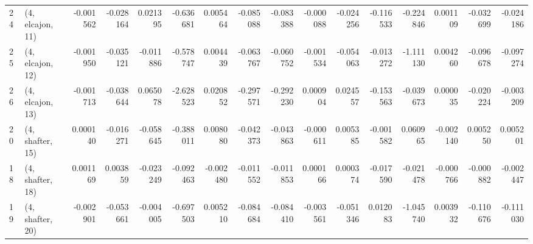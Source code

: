 \begin{tabular}{llrrrrrrrrrrrrrr}
24 &  (4, elcajon, 11) &  -0.001562 & -0.028164 &  0.021395 &  -0.636681 &  0.005464 &  -0.085088 & -0.083388 & -0.000088 & -0.024256 & -0.116533 &  -0.224846 &  0.001109 & -0.032699 & -0.024186 \\
25 &  (4, elcajon, 12) &  -0.001950 & -0.035121 & -0.011886 &  -0.578747 &  0.004439 &  -0.063767 & -0.060752 & -0.001534 & -0.054063 & -0.013272 &  -1.111130 &  0.004260 & -0.096678 & -0.097274 \\
26 &  (4, elcajon, 13) &  -0.001713 & -0.038644 &  0.065078 &  -2.628523 &  0.020852 &  -0.297571 & -0.292230 &  0.000904 &  0.024557 & -0.153563 &  -0.039673 &  0.000035 & -0.020224 & -0.003209 \\
20 &  (4, shafter, 15) &   0.000140 & -0.016271 & -0.058645 &  -0.388011 &  0.008080 &  -0.042373 & -0.043863 & -0.000611 &  0.005385 & -0.001582 &   0.060965 & -0.002140 &  0.005250 &  0.005201 \\
18 &  (4, shafter, 18) &   0.001169 &  0.003859 & -0.023249 &  -0.092463 & -0.002480 &  -0.011552 & -0.011853 &  0.000166 &  0.000374 & -0.017590 &  -0.021478 & -0.000766 & -0.000882 & -0.002447 \\
19 &  (4, shafter, 20) &  -0.002901 & -0.053661 & -0.004005 &  -0.697503 &  0.005210 &  -0.084684 & -0.084410 & -0.003561 & -0.051346 &  0.012083 &  -1.045740 &  0.003932 & -0.110676 & -0.111030 \\
\bottomrule
\end{tabular}
